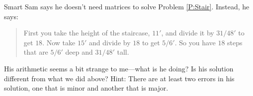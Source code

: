 \begin{prob}
Smart Sam says he doesn't need matrices to solve
Problem \ref{P:Stair}. Instead, he says:
\begin{quote}
First you take the height of the staircase, $11'$, and divide it by
$31/48'$ to get $18$. Now take $15'$ and divide by $18$ to get
$5/6'$. So you have $18$ steps that are $5/6'$ deep and $31/48'$ tall.
\end{quote}
His arithmetic seems a bit strange to me---what is he doing?  Is his
solution different from what we did above? Hint: There are at least
two errors in his solution, one that is minor and another that is
major.
\end{prob}
